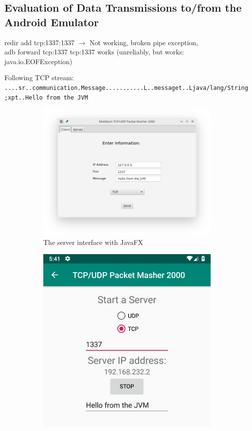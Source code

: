 \subsection{Evaluation of Data Transmissions to/from the Android Emulator}

redir add tcp:1337:1337 $\rightarrow$ Not working, broken pipe exception,\\
adb forward tcp:1337 tcp:1337 works (unreliably, but works:  java.io.EOFException)

Following TCP stream:\\
\texttt{....sr..communication.Message...........L..messaget..Ljava/lang/String;xpt..Hello from the JVM}



\begin{figure}[H]
	\centering
	\begin{subfigure}{.49\textwidth}
		\centering
		\includegraphics[width=1\linewidth]{images/task3/desktopTCP.png}
		\caption{The server interface with JavaFX}
		\label{fig:desktopTCP}
	\end{subfigure}
\begin{subfigure}{.49\textwidth}
	\centering
	\includegraphics[width=0.74\linewidth]{images/task3/AndroidTCP.png}

\end{subfigure}
\end{figure}
